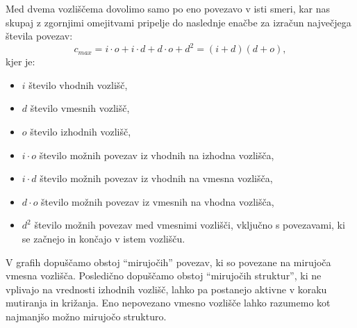 \documentclass[a4paper,12pt,openright]{book}
\begin{document}
    Med dvema vozliščema dovolimo samo po eno povezavo v isti smeri, kar nas skupaj z zgornjimi omejitvami pripelje do naslednje
    enačbe za izračun največjega števila povezav:
    \begin{equation}
        c_{max} = i \cdot o + i \cdot d + d \cdot o + d^2 = (i + d)(d + o),
        \label{eq:edge_max}
    \end{equation}
    kjer je:
    \begin{itemize}
        \item $i$ število vhodnih vozlišč,
        \item $d$ število vmesnih vozlišč,
        \item $o$ število izhodnih vozlišč,
        \item $i \cdot o$ število možnih povezav iz vhodnih na izhodna vozlišča,
        \item $i \cdot d$ število možnih povezav iz vhodnih na vmesna vozlišča,
        \item $d \cdot o$ število možnih povezav iz vmesnih na vhodna vozlišča,
        \item $d^2$ število možnih povezav med vmesnimi vozlišči, vključno s povezavami, ki se začnejo in končajo v istem vozlišču.
    \end{itemize}

    V grafih dopuščamo obstoj \enquote{mirujočih} povezav, ki so povezane na mirujoča vmesna vozlišča.
    Posledično dopuščamo obstoj \enquote{mirujočih struktur}, ki ne vplivajo na vrednosti izhodnih vozlišč,
    lahko pa postanejo aktivne v koraku mutiranja in križanja.
    Eno nepovezano vmesno vozlišče lahko razumemo kot najmanjšo možno mirujočo strukturo.
\end{document}
